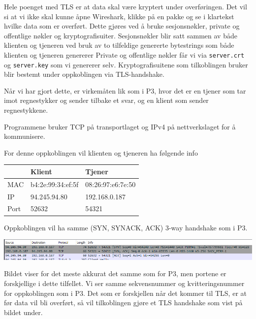 \documentclass[12pt]{article}
\begin{document}
    Hele poenget med TLS er at data skal være kryptert under overføringen. Det vil si at vi 
    ikke skal kunne åpne Wireshark, klikke på en pakke og se i klartekst hvilke data som er 
    overført. Dette gjøres ved å bruke sesjonsnøkler, private og offentlige nøkler og 
    kryptografisuiter. Sesjonsnøkler blir satt sammen av både klienten og tjeneren ved bruk av 
    to tilfeldige genererte bytestrings som både klienten og tjeneren genererer
    Private og offentlige nøkler får vi via \verb|server.crt| og \verb|server.key| som vi 
    genererer selv. Kryptografisuitene som tilkoblingen bruker blir bestemt under oppkoblingen 
    via TLS-handshake.

    Når vi har gjort dette, er virkemåten lik som i P3, hvor det er en tjener som tar imot regnestykker
    og sender tilbake et svar, og en klient som sender regnestykkene.

    Programmene bruker TCP på transportlaget og IPv4 på nettverkslaget for å 
    kommunisere.

    For denne oppkoblingen vil klienten og tjeneren ha følgende info

    \begin{center}
        \begin{tabular}{|l|l|l|}
            \hline
                 & Klient            & Tjener            \\ \hline
            MAC  & b4:2e:99:34:ef:5f & 08:26:97:e6:7e:50 \\ \hline
            IP   & 94.245.94.80      & 192.168.0.187     \\ \hline
            Port & 52632             & 54321             \\ \hline
        \end{tabular}
    \end{center}
    
    Oppkoblingen vil ha samme (SYN, SYNACK, ACK) 3-way handshake som i P3. 

    \begin{center}
        \includegraphics[width=\linewidth]{assets/ce56Xhh.png}
    \end{center}

    Bildet viser for det meste akkurat det samme som for P3, men portene er forskjellige i dette
    tilfellet. Vi ser samme sekvensnummer og kvitteringsnummer for oppkoblingen som i P3. Det 
    som er forskjellen når det kommer til TLS, er at før data vil bli overført, 
    så vil tilkoblingen gjøre et TLS handshake som vist på bildet under. 
    
\end{document}
